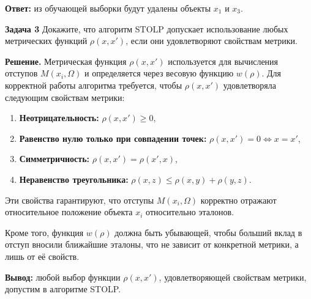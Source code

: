 \textbf{Ответ:} из обучающей выборки будут удалены объекты \(x_1\) и \(x_3\).

\textbf{Задача 3}
Докажите, что алгоритм STOLP допускает использование любых метрических функций \( \rho(x, x') \), если они удовлетворяют свойствам метрики.

\textbf{Решение.}  
Метрическая функция \( \rho(x, x') \) используется для вычисления отступов \(M(x_i, \Omega)\) и определяется через весовую функцию \(w(\rho)\). Для корректной работы алгоритма требуется, чтобы \( \rho(x, x') \) удовлетворяла следующим свойствам метрики:
\begin{enumerate}
    \item \textbf{Неотрицательность:} \(\rho(x, x') \geq 0\),  
    \item \textbf{Равенство нулю только при совпадении точек:} \(\rho(x, x') = 0 \iff x = x'\),  
    \item \textbf{Симметричность:} \(\rho(x, x') = \rho(x', x)\),  
    \item \textbf{Неравенство треугольника:} \(\rho(x, z) \leq \rho(x, y) + \rho(y, z)\).  
\end{enumerate}

Эти свойства гарантируют, что отступы \(M(x_i, \Omega)\) корректно отражают относительное положение объекта \(x_i\) относительно эталонов.  

Кроме того, функция \(w(\rho)\) должна быть убывающей, чтобы больший вклад в отступ вносили ближайшие эталоны, что не зависит от конкретной метрики, а лишь от её свойств.

\textbf{Вывод:} любой выбор функции \( \rho(x, x') \), удовлетворяющей свойствам метрики, допустим в алгоритме STOLP.

